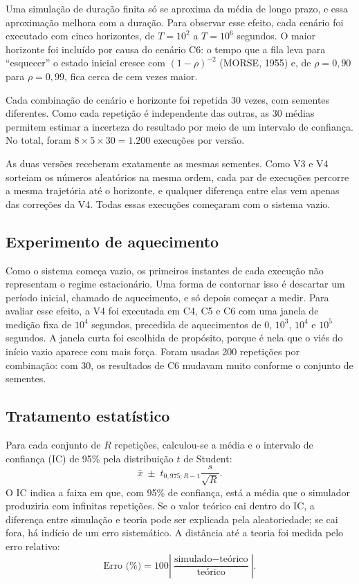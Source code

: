 \documentclass[
  article,      %
  10pt,         %
  oneside,
  a4paper,
  twocolumn,    %
  english,
  brazil        %
]{abntex2}
\begin{document}
Uma simulação de duração finita só se aproxima da média de longo prazo, e essa aproximação melhora com a duração. Para observar esse efeito, cada cenário foi executado com cinco horizontes, de $T=10^2$ a $T=10^6$ segundos. O maior horizonte foi incluído por causa do cenário C6: o tempo que a fila leva para ``esquecer'' o estado inicial cresce com $(1-\rho)^{-2}$ (MORSE, 1955) e, de $\rho=0{,}90$ para $\rho=0{,}99$, fica cerca de cem vezes maior.

Cada combinação de cenário e horizonte foi repetida 30 vezes, com sementes diferentes. Como cada repetição é independente das outras, as 30 médias permitem estimar a incerteza do resultado por meio de um intervalo de confiança. No total, foram $8\times5\times30=1.200$ execuções por versão.

As duas versões receberam exatamente as mesmas sementes. Como V3 e V4 sorteiam os números aleatórios na mesma ordem, cada par de execuções percorre a mesma trajetória até o horizonte, e qualquer diferença entre elas vem apenas das correções da V4. Todas essas execuções começaram com o sistema vazio.

\subsection{Experimento de aquecimento}

Como o sistema começa vazio, os primeiros instantes de cada execução não representam o regime estacionário. Uma forma de contornar isso é descartar um período inicial, chamado de aquecimento, e só depois começar a medir. Para avaliar esse efeito, a V4 foi executada em C4, C5 e C6 com uma janela de medição fixa de $10^4$ segundos, precedida de aquecimentos de 0, $10^3$, $10^4$ e $10^5$ segundos. A janela curta foi escolhida de propósito, porque é nela que o viés do início vazio aparece com mais força. Foram usadas 200 repetições por combinação: com 30, os resultados de C6 mudavam muito conforme o conjunto de sementes.

\subsection{Tratamento estatístico}

Para cada conjunto de $R$ repetições, calculou-se a média e o intervalo de confiança (IC) de 95\% pela distribuição $t$ de Student:
\begin{equation}
  \bar{x}\;\pm\;t_{0{,}975;R-1}\frac{s}{\sqrt{R}}.
  \label{eq:ic}
\end{equation}
O IC indica a faixa em que, com 95\% de confiança, está a média que o simulador produziria com infinitas repetições. Se o valor teórico cai dentro do IC, a diferença entre simulação e teoria pode ser explicada pela aleatoriedade; se cai fora, há indício de um erro sistemático. A distância até a teoria foi medida pelo erro relativo:
\begin{equation}
  \text{Erro (\%)}=
  100\left|\frac{\text{simulado}-\text{teórico}}{\text{teórico}}\right|.
  \label{eq:erro-relativo}
\end{equation}
\end{document}
